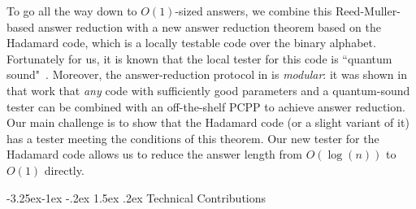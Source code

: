 \documentclass[11pt]{article}
\makeatletter
\renewcommand{\subsection}{\@startsection{subsection}{2}{\z@}%
             {-3.25ex\@plus -1ex \@minus -.2ex}%
             {1.5ex \@plus .2ex}%
             {\normalfont\large\scshape\bfseries}}
\theoremstyle{plain}
\theoremstyle{definition}
\newcommand{\1}{\mathbb{1}} %
\makeatother
\begin{document}
To go all the way down to $O(1)$-sized answers, we combine this Reed-Muller-based answer reduction with a new answer reduction theorem based on the Hadamard code, which is a locally testable code over the binary alphabet. Fortunately for us, it is known that the local tester for this code is ``quantum sound"~\cite{ito2012,NV17}. Moreover, the answer-reduction protocol in \cite{neexp} is \emph{modular}: it was shown in that work that \emph{any} code with sufficiently good parameters and a quantum-sound tester can be combined with an off-the-shelf PCPP to achieve answer reduction. Our main challenge is to show that the Hadamard code (or a slight variant of it) has a tester meeting the conditions of this theorem. Our new tester for the Hadamard code allows us to reduce the answer length from 
$O(\log(n))$ to $O(1)$ directly.



%
\subsection{Technical Contributions}
\label{sec:technical_contribution}
\end{document}
